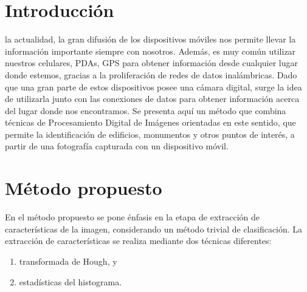 \documentclass[conference,a4paper,10pt,oneside,final]{tfmpd}
\begin{document}
\section{Introducción}
%
%
%
 la actualidad, la gran difusión de los dispositivos móviles nos
permite llevar la información importante siempre con nosotros. Además, es muy
común utilizar nuestros celulares, PDAs, GPS para obtener %
información desde cualquier lugar donde estemos, gracias a la proliferación de
redes de datos inalámbricas. Dado que una gran parte de estos dispositivos
posee una cámara
digital, surge la idea de utilizarla junto con las conexiones de datos para
obtener información acerca del lugar donde nos encontramos. Se presenta aquí
un método que combina técnicas de Procesamiento Digital de Imágenes orientadas
en este sentido, que permite la
identificación de edificios, monumentos y otros puntos de interés, a partir
de una fotografía capturada con un dispositivo móvil.
%
%
%
%
\section{Método propuesto}
En el método propuesto se pone énfasis en la etapa de
extracción de características de la imagen, considerando
un método trivial de clasificación.
La extracción de características se realiza %
mediante dos técnicas diferentes:
\begin{enumerate}
\item transformada de Hough, y
\item estadísticas del histograma.
\end{enumerate}
%
%
\end{document}
